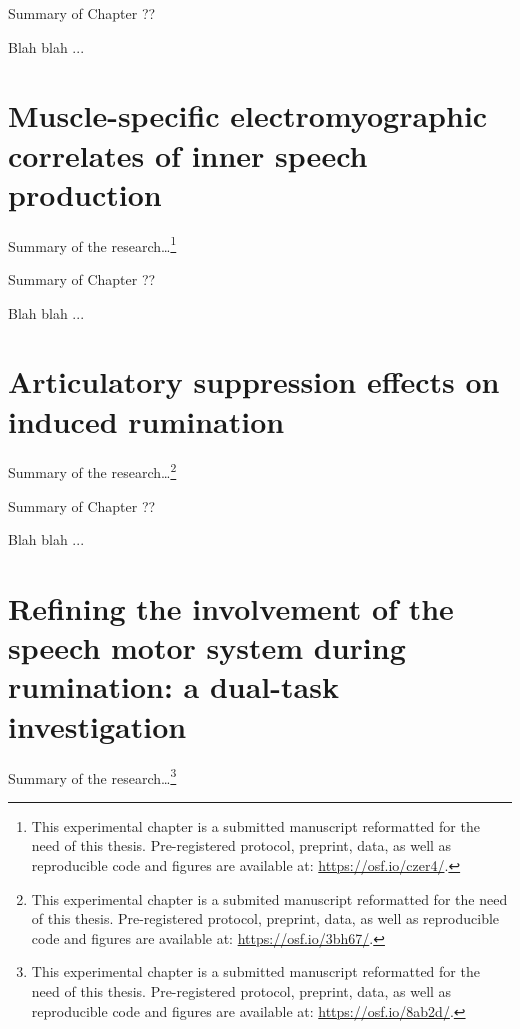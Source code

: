 \documentclass[a4paper,12pt,twoside,openright,oldfontcommands]{memoir}
\let\rmarkdownfootnote\footnote%
\def\footnote{\protect\rmarkdownfootnote}
\newcommand\getcurrentref[1]{
 \ifnumequal{\value{#1}}{0}
  {??}
  {\the\value{#1}}
}
\begin{document}
\begin{summary}{Summary of Chapter\getcurrentref{chapter}}

Blah blah ...

\end{summary}

\chapter{Muscle-specific electromyographic correlates of inner speech
production}\label{muscle-specific-electromyographic-correlates-of-inner-speech-production}

Summary of the research\ldots{}\footnote{This experimental chapter is a
  submitted manuscript reformatted for the need of this thesis.
  Pre-registered protocol, preprint, data, as well as reproducible code
  and figures are available at: \url{https://osf.io/czer4/}.}

\begin{summary}{Summary of Chapter\getcurrentref{chapter}}

Blah blah ...

\end{summary}

\chapter{Articulatory suppression effects on induced
rumination}\label{articulatory-suppression-effects-on-induced-rumination}

Summary of the research\ldots{}\footnote{This experimental chapter is a
  submited manuscript reformatted for the need of this thesis.
  Pre-registered protocol, preprint, data, as well as reproducible code
  and figures are available at: \url{https://osf.io/3bh67/}.}

\begin{summary}{Summary of Chapter\getcurrentref{chapter}}

Blah blah ...

\end{summary}

\chapter{Refining the involvement of the speech motor system during
rumination: a dual-task
investigation}\label{refining-the-involvement-of-the-speech-motor-system-during-rumination-a-dual-task-investigation}

Summary of the research\ldots{}\footnote{This experimental chapter is a
  submitted manuscript reformatted for the need of this thesis.
  Pre-registered protocol, preprint, data, as well as reproducible code
  and figures are available at: \url{https://osf.io/8ab2d/}.}
\end{document}
